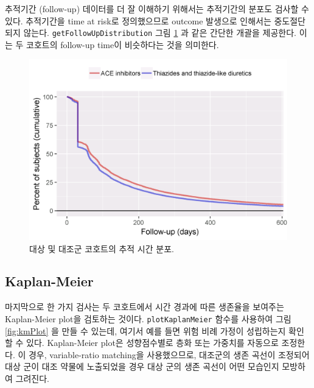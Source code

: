\documentclass[11pt]{book}
\theoremstyle{definition}
\theoremstyle{definition}
\theoremstyle{definition}
\theoremstyle{remark}
\begin{document}
추적기간 (follow-up) 데이터를 더 잘 이해하기 위해서는 추적기간의 분포도
검사할 수 있다. 추적기간을 time at risk로 정의했으므로 outcome 발생으로
인해서는 중도절단되지 않는다. \texttt{getFollowUpDistribution} 그림
\ref{fig:followUp} 과 같은 간단한 개괄을 제공한다. 이는 두 코호트의
follow-up time이 비슷하다는 것을 의미한다.

\begin{figure}

{\centering \includegraphics[width=0.8\linewidth]{images/PopulationLevelEstimation/followUp} 

}

\caption{대상 및 대조군 코호트의 추적 시간 분포.}\label{fig:followUp}
\end{figure}

\subsection{Kaplan-Meier}\label{kaplan-meier}

마지막으로 한 가지 검사는 두 코호트에서 시간 경과에 따른 생존율을
보여주는 Kaplan-Meier plot을 검토하는 것이다. \texttt{plotKaplanMeier}
함수를 사용하여 그림 \ref{fig:kmPlot} 을 만들 수 있는데, 여기서 예를
들면 위험 비례 가정이 성립하는지 확인할 수 있다. Kaplan-Meier plot은
성향점수별로 층화 또는 가중치를 자동으로 조정한다. 이 경우,
variable-ratio matching을 사용했으므로, 대조군의 생존 곡선이 조정되어
대상 군이 대조 약물에 노출되었을 경우 대상 군의 생존 곡선이 어떤
모습인지 모방하여 그려진다. 
\end{document}
